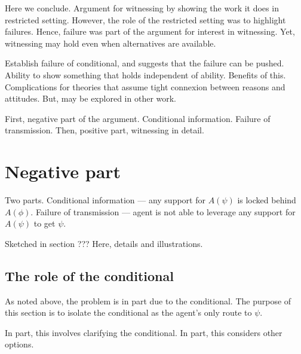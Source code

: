\documentclass[10pt]{article}
\newcommand{\hozlinedash}[0]{%
  \noindent\hdashrule[0.5ex][c]{\textwidth}{.1pt}{2.5pt}
}
\begin{document}
\begin{note}
  Here we conclude.
  Argument for witnessing by showing the work it does in restricted setting.
  However, the role of the restricted setting was to highlight failures.
  Hence, failure was part of the argument for interest in witnessing.
  Yet, witnessing may hold even when alternatives are available.

  Establish failure of conditional, and suggests that the failure can be pushed.
  Ability to show something that holds independent of ability.
  Benefits of this.
  Complications for theories that assume tight connexion between reasons and attitudes.
  But, may be explored in other work.
\end{note}

\begin{note}[Outline]
  First, negative part of the argument.
  Conditional information.
  Failure of transmission.
  Then, positive part, witnessing in detail.
\end{note}

\hozlinedash

\section{Negative part}
\label{sec:negative-part}

Two parts.
Conditional information --- any support for \(A(\psi)\) is locked behind \(A(\phi)\).
Failure of transmission --- agent is not able to leverage any support for \(A(\psi)\) to get \(\psi\).

Sketched in {\color{red} section ???}
Here, details and illustrations.

\subsection{The role of the conditional}
\label{sec:role-conditional}

\begin{note}[Sketch]
  As noted above, the problem is in part due to the conditional.
  The purpose of this section is to isolate the conditional as the agent's only route to \(\psi\).

  In part, this involves clarifying the conditional.
  In part, this considers other options.
\end{note}
\end{document}
